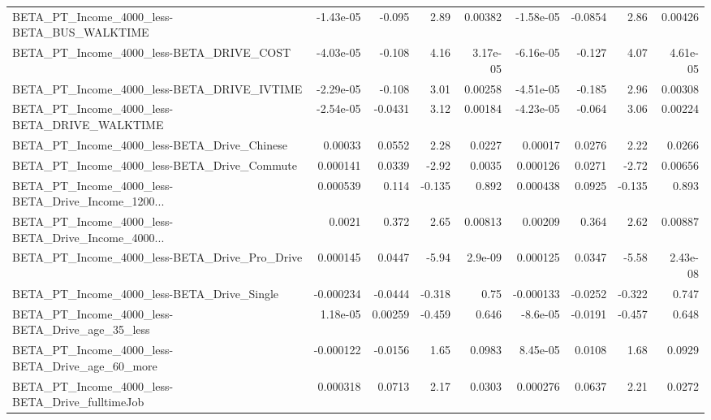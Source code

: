 \begin{tabular}{lrrrrrrrr}
BETA\_PT\_Income\_4000\_less-BETA\_BUS\_WALKTIME         &   -1.43e-05 &       -0.095 &      2.89 &  0.00382 &  -1.58e-05 &     -0.0854 &         2.86 &       0.00426 \\
BETA\_PT\_Income\_4000\_less-BETA\_DRIVE\_COST           &   -4.03e-05 &       -0.108 &      4.16 & 3.17e-05 &  -6.16e-05 &      -0.127 &         4.07 &      4.61e-05 \\
BETA\_PT\_Income\_4000\_less-BETA\_DRIVE\_IVTIME         &   -2.29e-05 &       -0.108 &      3.01 &  0.00258 &  -4.51e-05 &      -0.185 &         2.96 &       0.00308 \\
BETA\_PT\_Income\_4000\_less-BETA\_DRIVE\_WALKTIME       &   -2.54e-05 &      -0.0431 &      3.12 &  0.00184 &  -4.23e-05 &      -0.064 &         3.06 &       0.00224 \\
BETA\_PT\_Income\_4000\_less-BETA\_Drive\_Chinese        &     0.00033 &       0.0552 &      2.28 &   0.0227 &    0.00017 &      0.0276 &         2.22 &        0.0266 \\
BETA\_PT\_Income\_4000\_less-BETA\_Drive\_Commute        &    0.000141 &       0.0339 &     -2.92 &   0.0035 &   0.000126 &      0.0271 &        -2.72 &       0.00656 \\
BETA\_PT\_Income\_4000\_less-BETA\_Drive\_Income\_1200... &    0.000539 &        0.114 &    -0.135 &    0.892 &   0.000438 &      0.0925 &       -0.135 &         0.893 \\
BETA\_PT\_Income\_4000\_less-BETA\_Drive\_Income\_4000... &      0.0021 &        0.372 &      2.65 &  0.00813 &    0.00209 &       0.364 &         2.62 &       0.00887 \\
BETA\_PT\_Income\_4000\_less-BETA\_Drive\_Pro\_Drive      &    0.000145 &       0.0447 &     -5.94 &  2.9e-09 &   0.000125 &      0.0347 &        -5.58 &      2.43e-08 \\
BETA\_PT\_Income\_4000\_less-BETA\_Drive\_Single         &   -0.000234 &      -0.0444 &    -0.318 &     0.75 &  -0.000133 &     -0.0252 &       -0.322 &         0.747 \\
BETA\_PT\_Income\_4000\_less-BETA\_Drive\_age\_35\_less    &    1.18e-05 &      0.00259 &    -0.459 &    0.646 &   -8.6e-05 &     -0.0191 &       -0.457 &         0.648 \\
BETA\_PT\_Income\_4000\_less-BETA\_Drive\_age\_60\_more    &   -0.000122 &      -0.0156 &      1.65 &   0.0983 &   8.45e-05 &      0.0108 &         1.68 &        0.0929 \\
BETA\_PT\_Income\_4000\_less-BETA\_Drive\_fulltimeJob    &    0.000318 &       0.0713 &      2.17 &   0.0303 &   0.000276 &      0.0637 &         2.21 &        0.0272 \\

\end{tabular}
